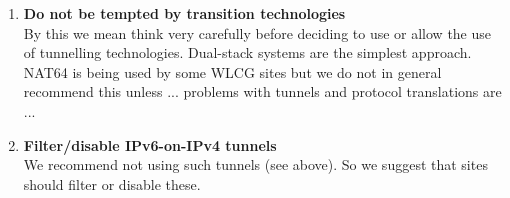\begin{enumerate}
\item {\bf Do not be tempted by transition technologies} \\
By this  we mean think very carefully before deciding to use or allow the use of tunnelling technologies.  Dual-stack systems are the simplest approach. NAT64 is being used by some WLCG sites but we do not in general recommend this unless ...
problems with tunnels and protocol translations are ...

\item {\bf Filter/disable IPv6-on-IPv4 tunnels} \\
We recommend not using such tunnels (see above).  So we suggest that sites should filter or disable these.


\end{enumerate}




